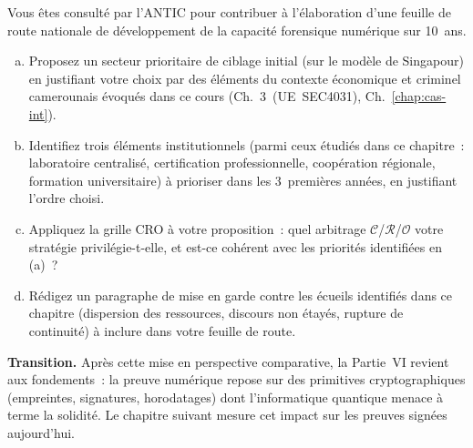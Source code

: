 \begin{boxexo}[title={\ding{45}\quad Exercice~25.3. Stratégie nationale argumentée \niveauexpert}]
Vous êtes consulté par l'ANTIC pour contribuer à l'élaboration
d'une feuille de route nationale de développement de la capacité
forensique numérique sur 10~ans.
\begin{enumerate}[(a)]
    \item Proposez un secteur prioritaire de ciblage initial
          (sur le modèle de Singapour) en justifiant votre choix
          par des éléments du contexte économique et criminel
          camerounais évoqués dans ce cours (Ch.~3~(UE~SEC4031),
          Ch.~\ref{chap:cas-int}).
    \item Identifiez trois éléments institutionnels (parmi ceux
          étudiés dans ce chapitre~: laboratoire centralisé,
          certification professionnelle, coopération régionale,
          formation universitaire) à prioriser dans les
          3~premières années, en justifiant l'ordre choisi.
    \item Appliquez la grille CRO à votre proposition~: quel
          arbitrage $\mathcal{C}$/$\mathcal{R}$/$\mathcal{O}$
          votre stratégie privilégie-t-elle, et est-ce cohérent
          avec les priorités identifiées en (a)~?
    \item Rédigez un paragraphe de mise en garde contre les
          écueils identifiés dans ce chapitre (dispersion des
          ressources, discours non étayés, rupture de continuité)
          à inclure dans votre feuille de route.
\end{enumerate}
\end{boxexo}

\bigskip

\begin{boxinfo}
\textbf{Transition.} Après cette mise en perspective comparative,
la Partie~VI revient aux fondements~: la preuve numérique repose sur
des primitives cryptographiques (empreintes, signatures, horodatages)
dont l'informatique quantique menace à terme la solidité. Le
chapitre suivant mesure cet impact sur les preuves signées
aujourd'hui.
\end{boxinfo}